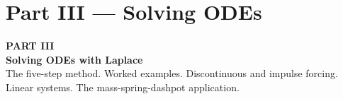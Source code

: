 \documentclass[aspectratio=169,11pt]{beamer}
\begin{document}

\section{Part III --- Solving ODEs}

{
\begin{frame}[plain]
\vspace{2cm}
{\color{accentorange}\Huge\textbf{PART III}}\\[0.4cm]
{\color{white}\Huge\textbf{Solving ODEs with Laplace}}\\[0.8cm]
{\color{white!85}\large The five-step method. Worked examples. Discontinuous and impulse forcing.\\
Linear systems. The mass-spring-dashpot application.}
\end{frame}
}
\end{document}
